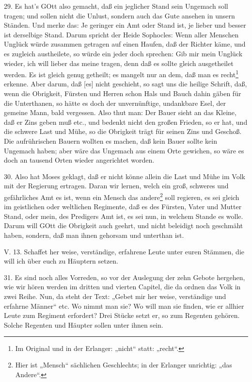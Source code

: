 29. Es hat’s GOtt also gemacht, daß ein jeglicher Stand sein Ungemach soll tragen; und sollen nicht die Unlust, sondern auch das Gute ansehen in unsern Ständen. Und merke das: Je geringer ein Amt oder Stand ist, je lieber und besser ist derselbige Stand. Darum spricht der Heide Sophocles: Wenn aller Menschen Unglück würde zusammen getragen auf einen Haufen, daß der Richter käme, und es zugleich austheilete, so würde ein jeder doch sprechen: Gib mir mein Unglück wieder, ich will lieber das meine tragen, denn daß es sollte gleich ausgetheilet werden. Es ist gleich genug getheilt; es mangelt nur an dem, daß man es recht\footnote{Im Original und in der Erlanger: „nicht“ statt: „recht“.} erkenne. Aber darum, daß [es] nicht geschieht, so sagt uns die heilige Schrift, daß, wenn die Obrigkeit, Fürsten und Herren schon Hals und Bauch dahin gäben für die Unterthanen, so hätte es doch der unvernünftige, undankbare Esel, der gemeine Mann, bald vergessen. Also thut man: Der Bauer sieht an das Kleine, daß er Zins geben muß etc., und bedenkt nicht den großen Frieden, so er hat, und die schwere Last und Mühe, so die Obrigkeit trägt für seinen Zins und Geschoß. Die aufrührischen Bauern wollten es machen, daß kein Bauer sollte kein Ungemach haben; aber wäre das Ungemach aus einem Orte gewichen, so wäre es doch an tausend Orten wieder angerichtet worden.

30. Also hat Moses geklagt, daß er nicht könne allein die Last und Mühe im Volk mit der Regierung ertragen. Daran wir lernen, welch ein groß, schweres und gefährliches Amt es ist, wenn ein Mensch das andere\footnote{Hier ist „Mensch“ sächlichen Geschlechts; in der Erlanger unrichtig: „das Andere“.} soll regieren, es sei gleich im geistlichen oder weltlichen Regimente, daß es des Fürsten, Vater und Mutter Stand, oder mein, des Predigers Amt ist, es sei nun, in welchem Stande es wolle. Darum will GOtt die Obrigkeit auch geehrt, und nicht beleidigt noch geschmäht haben, sondern, daß man ihnen gehorsam und unterthan ist.

\begin{schriftzitat}
V. 13. Schaffet her weise, verständige, erfahrene Leute unter euren Stämmen, die will ich über euch zu Häuptern setzen.
\end{schriftzitat}

31. Es sind noch alles Vorreden, so vor der Auslegung der zehn Gebote hergehen, wie wir hören werden im dritten und vierten Capitel, die da ordnen das Volk in zwei Reihe. Nun,
da steht der Text: „Gebet mir her weise, verständige und erfahrne Männer“ etc. Wo nimmt man sie? Wo will man sie finden, wie er allhier Leute zum Regiment erfordert? Drei Stücke setzt er, so zum Regenten gehören. Solche Regenten und Häupter sollen unter ihnen sein.

